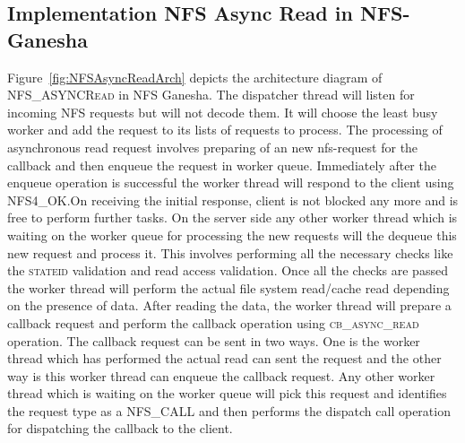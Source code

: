 \subsection{Implementation NFS Async Read in NFS-Ganesha}  

 Figure~\ref{fig:NFSAsyncReadArch} depicts the architecture diagram of \textsc{NFS\_ASYNCRead} in NFS Ganesha. The dispatcher thread will listen for incoming NFS requests but will not decode them. It will choose the least busy worker and add the request to its lists of requests to process. The processing of asynchronous read request involves preparing of an new nfs-request for the callback and then enqueue the request in worker queue. Immediately after the enqueue operation is successful the worker thread will respond to the client using \textsc{NFS4\_OK}.On receiving the initial response, client is not blocked any more and is free to perform further tasks. On the server side any other worker thread which is waiting on the worker queue for processing the new requests will the dequeue this new request and process it. This involves performing all the necessary checks like the \textsc{stateid} validation and read access validation. Once all the checks are passed the worker thread will perform the actual file system read/cache read depending on the presence of data. After reading the data, the worker thread will prepare a callback request and perform the callback operation using \textsc{cb\_async\_read} operation. The callback request can be sent in two ways. One is the worker thread which has performed the actual read can sent the request and the other way is this worker thread can enqueue the callback request. Any other worker thread which is waiting on the worker queue will pick this request and identifies the request type as a \textsc{NFS\_CALL} and then performs the dispatch call operation for dispatching the callback to the client. 
 
 






 
 
 








